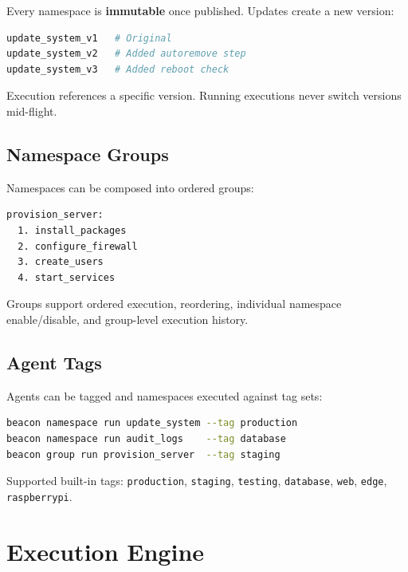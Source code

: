 \documentclass[12pt,a4paper]{article}
\begin{document}
Every namespace is \textbf{immutable} once published. Updates create a new version:

\begin{lstlisting}[language=bash]
update_system_v1   # Original
update_system_v2   # Added autoremove step
update_system_v3   # Added reboot check
\end{lstlisting}

Execution references a specific version. Running executions never switch versions mid-flight.

\subsection{Namespace Groups}

Namespaces can be composed into ordered groups:

\begin{lstlisting}[language=bash, caption={Example: Server Provisioning Group}]
provision_server:
  1. install_packages
  2. configure_firewall
  3. create_users
  4. start_services
\end{lstlisting}

Groups support ordered execution, reordering, individual namespace enable/disable, and group-level execution history.

\subsection{Agent Tags}

Agents can be tagged and namespaces executed against tag sets:

\begin{lstlisting}[language=bash]
beacon namespace run update_system --tag production
beacon namespace run audit_logs    --tag database
beacon group run provision_server  --tag staging
\end{lstlisting}

Supported built-in tags: \texttt{production}, \texttt{staging}, \texttt{testing}, \texttt{database}, \texttt{web}, \texttt{edge}, \texttt{raspberrypi}.

\section{Execution Engine}
\end{document}
